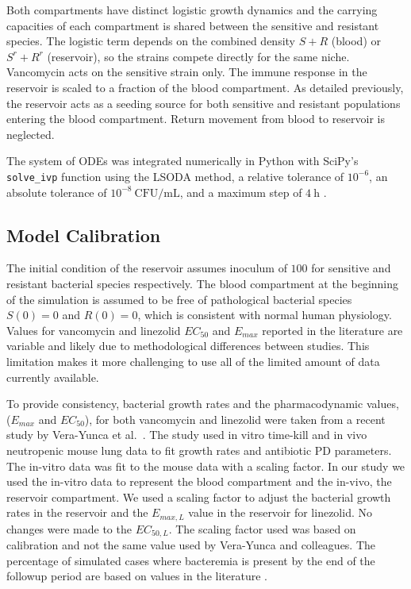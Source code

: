 \documentclass[journal]{IEEEtran}
\begin{document}
Both compartments have distinct logistic growth dynamics and the carrying
capacities of each compartment is shared between the sensitive and resistant species.
The logistic term depends on the combined density $S+R$ (blood) or $S^r+R^r$ (reservoir), so the strains compete directly for the same niche.
Vancomycin acts on the sensitive strain only.
The immune response in the reservoir is scaled to a fraction of the
blood compartment. As detailed previously, the reservoir acts as a seeding
source for both sensitive and resistant populations entering the blood
compartment. Return movement from blood to reservoir is neglected.

The system of ODEs was integrated numerically in Python with SciPy's
\texttt{solve\_ivp} function using the LSODA method, a relative tolerance
of $10^{-6}$, an absolute tolerance of $10^{-8}~\mathrm{CFU/mL}$, and a maximum
step of $4~\mathrm{h}$ \cite{2020SciPy-NMeth}.

\subsection{Model Calibration}
The initial condition of the reservoir assumes inoculum of $100$ for sensitive and resistant bacterial species respectively.
The blood compartment at the beginning of the simulation
is assumed to be free of pathological bacterial species $\mathit{S(0) = 0}$ and $\mathit{R(0) = 0}$, which is consistent with normal human physiology.  Values for vancomycin and linezolid $EC_{50}$ and $E_{max}$ reported in the literature
are variable and likely due to methodological differences between studies.  This limitation makes it more challenging
to use all of the limited amount of data currently available.

To provide consistency, bacterial growth rates and the pharmacodynamic values, ($E_{max}$ and $EC_{50}$), for both vancomycin and linezolid were taken from a recent study by Vera-Yunca et al.~\cite{VeraYunca2025}.
The study used in vitro time-kill and in vivo neutropenic mouse lung data to fit growth rates
and antibiotic PD parameters.  The in-vitro data was fit to the mouse data with a scaling factor.
In our study we used the in-vitro data to represent the blood compartment and the in-vivo, the reservoir compartment.
We used a scaling factor to adjust the bacterial growth rates in the reservoir and the $E_{max,L}$ value in the reservoir for linezolid.
No changes were made to the $EC_{50,L}$.  The scaling factor used was based on calibration and not the same value used by
Vera-Yunca and colleagues.  The percentage of simulated cases where bacteremia is present by the end of the followup period
are based on values in the literature \cite{garciadelpozo2018factors}.
\end{document}
